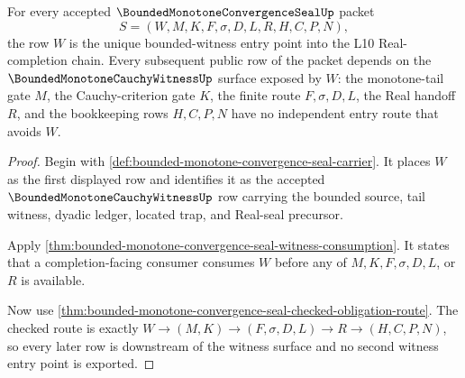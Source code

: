 \begin{theorem}
\label{thm:bounded-monotone-convergence-seal-witness-scope}
For every accepted $\BoundedMonotoneConvergenceSealUp$ packet
$$
S=(W,M,K,F,\sigma,D,L,R,H,C,P,N),
$$
the row $W$ is the unique bounded-witness entry point into the L10 Real-completion chain. Every subsequent public row of the packet depends on the $\BoundedMonotoneCauchyWitnessUp$ surface exposed by $W$: the monotone-tail gate $M$, the Cauchy-criterion gate $K$, the finite route $F,\sigma,D,L$, the Real handoff $R$, and the bookkeeping rows $H,C,P,N$ have no independent entry route that avoids $W$.
\end{theorem}
\begin{proof}
Begin with \autoref{def:bounded-monotone-convergence-seal-carrier}. It places $W$ as the first displayed row and identifies it as the accepted $\BoundedMonotoneCauchyWitnessUp$ row carrying the bounded source, tail witness, dyadic ledger, located trap, and Real-seal precursor.

Apply \autoref{thm:bounded-monotone-convergence-seal-witness-consumption}. It states that a completion-facing consumer consumes $W$ before any of $M,K,F,\sigma,D,L$, or $R$ is available.

Now use \autoref{thm:bounded-monotone-convergence-seal-checked-obligation-route}. The checked route is exactly $W \to (M,K) \to (F,\sigma,D,L) \to R \to (H,C,P,N)$, so every later row is downstream of the witness surface and no second witness entry point is exported.
\end{proof}

